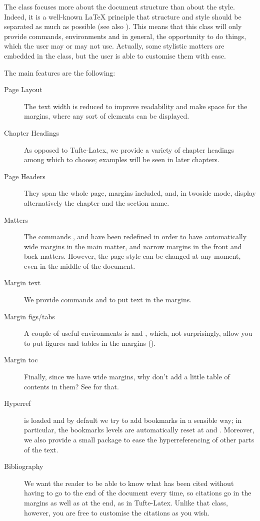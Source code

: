The  class focuses more about the document structure than 
about the style. Indeed, it is a well-known \LaTeX\xspace principle that 
structure and style should be separated as much as possible (see also 
). This means that this class will only provide 
commands, environments and in general, the opportunity to do things, 
which the user may or may not use. Actually, some stylistic matters are 
embedded in the class, but the user is able to customise them with ease.

The main features are the following:

\begin{description}
	\item[Page Layout] The text width is reduced to improve readability 
	and make space for the margins, where any sort of elements can be 
	displayed.
	\item[Chapter Headings] As opposed to Tufte-Latex, we provide a 
	variety of chapter headings among which to choose; examples will be 
	seen in later chapters.
	\item[Page Headers] They span the whole page, margins included, and, 
	in twoside mode, display alternatively the chapter and the section 
	name.
	\item[Matters] The commands , 
	 and  have been redefined in 
	order to have automatically wide margins in the main matter, and 
	narrow margins in the front and back matters. However, the page 
	style can be changed at any moment, even in the middle of the 
	document.
	\item[Margin text] We provide commands  and 
	 to put text in the 
	margins.
	\item[Margin figs/tabs] A couple of useful environments is 
	 and , which, not 
	surprisingly, allow you to put figures and tables in the margins 
	(\cfr {}).
	\item[Margin toc] Finally, since we have wide margins, why don't add 
	a little table of contents in them? See  for 
	that.
	\item[Hyperref]  is loaded and by default we try 
	to add bookmarks in a sensible way; in particular, the bookmarks 
	levels are automatically reset at  and 
	. Moreover, we also provide a small package to 
	ease the hyperreferencing of other parts of the text.
	\item[Bibliography] We want the reader to be able to know what has 
	been cited without having to go to the end of the document every 
	time, so citations go in the margins as well as at the end, as in 
	Tufte-Latex. Unlike that class, however, you are free to customise 
	the citations as you wish.
\end{description}

